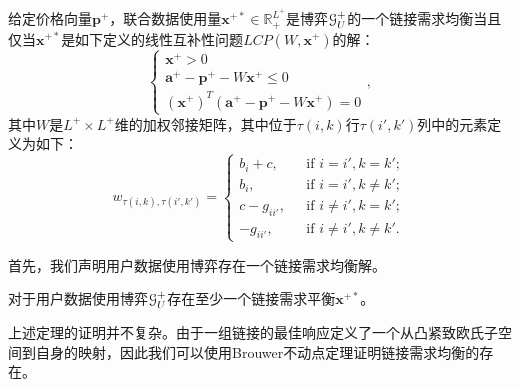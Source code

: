 \begin{lm}\label{lm:LCP}

给定价格向量$\mathbf{p}^{+}$，联合数据使用量$\mathbf{x}^{+*}\in\mathbb{R}^{L^+}_+$是博弈$\mathcal{G}_U^{+}$的一个链接需求均衡当且仅当$\mathbf{x}^{+*}$是如下定义的线性互补性问题$LCP(W,\mathbf{x}^{+})$的解：
\begin{equation}\label{eq:LCP}
\begin{cases}
    \mathbf{x}^{+}>0\\
    \mathbf{a}^{+}-\mathbf{p}^{+}-W\mathbf{x}^{+}\leq 0\\
    (\mathbf{x}^{+})^T(\mathbf{a}^{+}-\mathbf{p}^{+}-W\mathbf{x^{+}})=0
\end{cases},
\end{equation}
\noindent 其中$W$是$L^+\times L^+$维的加权邻接矩阵，其中位于$\tau(i,k)$行$\tau(i',k')$列中的元素定义为如下：
\begin{equation}
w_{\tau(i,k),\tau(i',k')}=
\begin{cases}
  b_i+c,~~~&\mbox{if $i=i', k=k'$};\\
  b_i,~~~&\mbox{if $i=i', k\neq k'$};\\
  c-g_{ii'},~~~&\mbox{if $i\neq i', k=k'$};\\
  -g_{ii'},~~~&\mbox{if $i\neq i', k\neq k'$}.
\end{cases}
\end{equation}
\end{lm}



首先，我们声明用户数据使用博弈存在一个链接需求均衡解。

\begin{thm}
对于用户数据使用博弈$\mathcal{G}_U^+$存在至少一个链接需求平衡$\mathbf{x}^{+*}$。
\end{thm}
上述定理的证明并不复杂。由于一组链接的最佳响应定义了一个从凸紧致欧氏子空间到自身的映射，因此我们可以使用Brouwer不动点定理证明链接需求均衡的存在。 


